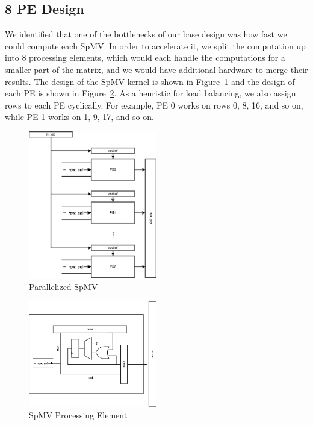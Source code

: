 \documentclass[10pt]{article}
\begin{document}
\subsection{8 PE Design}
We identified that one of the bottlenecks of our base design was how fast we could compute each SpMV.
In order to accelerate it, we split the computation up into 8 processing elements, which would each 
handle the computations for a smaller part of the matrix, and we would have additional hardware
to merge their results. The design of the SpMV kernel is shown in Figure~\ref{fig:spmv_diagram} and the
design of each PE is shown in Figure~\ref{fig:pe_diagram}. As a heuristic for load balancing, we also
assign rows to each PE cyclically. For example, PE 0 works on rows 0, 8, 16, and so on, while PE 1 works
on 1, 9, 17, and so on.

\begin{figure}[h!]
  \centering
  \includegraphics[width=0.5\textwidth]{spmv_diagram.png}
  \caption{Parallelized SpMV}
  \label{fig:spmv_diagram}
\end{figure}

\begin{figure}[h!]
  \centering
  \includegraphics[width=0.5\textwidth]{pe_diagram.png}
  \caption{SpMV Processing Element}
  \label{fig:pe_diagram}
\end{figure}
\end{document}
